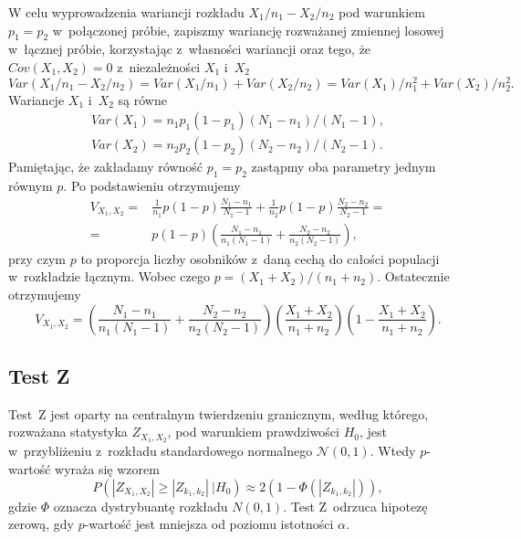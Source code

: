 W celu wyprowadzenia wariancji rozkładu $X_1/n_1-X_2/n_2$ pod warunkiem $p_1=p_2$ w~połączonej próbie, zapiszmy wariancję rozważanej zmiennej losowej w~łącznej próbie, korzystając z~własności wariancji oraz tego, że $Cov(X_1,X_2)=0$ z~niezależności $X_1$ i~$X_2$
\begin{equation}
Var(X_1/n_1-X_2/n_2)=Var(X_1/n_1) + Var(X_2/n_2) = Var(X_1)/n_1^2+Var(X_2)/n_2^2.
\end{equation}
Wariancje $X_1$ i~$X_2$ są równe
\begin{align}
Var(X_1)=n_1 p_1 (1-p_1)(N_1-n_1)/(N_1-1),\\
Var(X_2)=n_2 p_2 (1-p_2)(N_2-n_2)/(N_2-1).
\end{align}
Pamiętając, że zakładamy równość $p_1=p_2$ zastąpmy oba parametry jednym równym $p$. Po podstawieniu otrzymujemy
\begin{equation}
\begin{split}
V_{X_1,X_2} =& \frac{1}{n_1}p(1-p)\frac{N_1-n_1}{N_1-1} + \frac{1}{n_2}p(1-p)\frac{N_2-n_2}{N_2-1}= \\
=&p(1-p)\left(\frac{N_1-n_1}{n_1(N_1-1)}+\frac{N_2-n_2}{n_2(N_2-1)}\right),
\end{split}
\end{equation}
przy czym $p$ to proporcja liczby osobników z~daną cechą do całości populacji w~rozkładzie łącznym. Wobec czego $p=(X_1+X_2)/(n_1+n_2)$. Ostatecznie otrzymujemy
\begin{equation}
V_{X_1,X_2} = \left(\frac{N_1-n_1}{n_1(N_1-1)}+\frac{N_2-n_2}{n_2(N_2-1)}\right)\left(\frac{X_1+X_2}{n_1+n_2}\right)\left(1-\frac{X_1+X_2}{n_1+n_2}\right).
\end{equation}

\subsection{Test Z}
Test~Z jest oparty na centralnym twierdzeniu granicznym, według którego, rozważana statystyka $Z_{X_1,X_2}$, pod warunkiem prawdziwości $H_0$, jest w~przybliżeniu z~rozkładu standardowego normalnego $\mathcal{N}(0,1)$. Wtedy $p$-wartość wyraża się wzorem
\begin{equation}
P(|Z_{X_1,X_2}|\geq|Z_{k_1,k_2}|\ |H_0) \approx 2(1-\Phi(|Z_{k_1,k_2}|)),
\end{equation}
gdzie $\Phi$ oznacza dystrybuantę rozkładu $N(0,1)$. Test Z~odrzuca hipotezę zerową, gdy $p$-wartość jest mniejsza od poziomu istotności $\alpha$.

